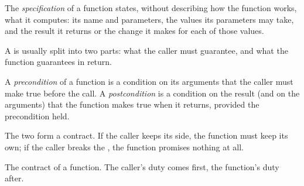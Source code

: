 \begin{definition}[Specification]\label{def:g10:specifications-and-tests:specification}
The \emph{specification} of a function states, without describing how the function works,
what it computes: its name and parameters, the values its parameters may take, and the result it returns or the
change it makes for each of those values.
\end{definition}

A  is usually split into two parts: what the caller must guarantee, and what the function
guarantees in return.

\begin{definition}\label{def:g10:specifications-and-tests:pre-post}
A \emph{precondition} of a function is a condition on its arguments that the caller must
make true before the call. A \emph{postcondition} is a condition on the result (and on the
arguments) that the function makes true when it returns, provided the precondition held.
\end{definition}

The two form a contract. If the caller keeps its side, the function must keep its own; if the caller breaks the
, the function promises nothing at all.

\begin{omfigure}

{\small The contract of a function. The caller's duty comes first, the function's duty after.}
\end{omfigure}

